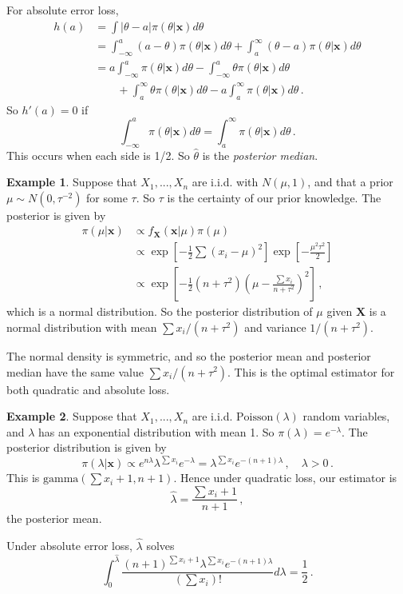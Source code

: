 \documentclass[a4paper,11pt]{article}
\theoremstyle{definition}
\newtheorem*{ex}{Example}
\numberwithin{equation}{section}
\begin{document}
For absolute error loss,
\begin{align*}
    h(a)&=\int|\theta-a|\pi(\theta|\mathbf{x})d\theta\\
    &=\int^a_{-\infty}(a-\theta)\pi(\theta|\mathbf{x})d\theta+\int^\infty_a(\theta-a)\pi(\theta|\mathbf{x})d\theta\\
    &= a\int^a_{-\infty}\pi(\theta|\mathbf{x})d\theta-\int^a_{-\infty}\theta\pi(\theta|\mathbf{x})d\theta\\
    &\qquad+\int_a^\infty\theta\pi(\theta|\mathbf{x})d\theta-a\int_a^\infty\pi(\theta|\mathbf{x})d\theta\,.
\end{align*}
So $h'(a)=0$ if
\[
\int^a_{-\infty}\pi(\theta|\mathbf{x})d\theta=\int_a^\infty\pi(\theta|\mathbf{x})d\theta\,.
\]
This occurs when each side is 1/2. So $\hat{\theta}$ is the \emph{posterior median}.

\begin{ex}
Suppose that $X_1,...,X_n$ are i.i.d. with $N(\mu,1)$, and that a prior $\mu\sim N(0,\tau^{-2})$ for some $\tau$. So $\tau$ is the certainty of our prior knowledge. The posterior is given by
\begin{align*}
    \pi(\mu|\mathbf{x})&\propto f_\mathbf{X}(\mathbf{x}|\mu)\pi(\mu)\\
    &\propto\exp\left[-\frac{1}{2}\sum(x_i-\mu)^2\right]\exp\left[-\frac{\mu^2\tau^2}{2}\right]\\
    &\propto\exp\left[-\frac{1}{2}(n+\tau^2)\left(\mu-\frac{\sum x_i}{n+\tau^2}\right)^2\right]\,,
\end{align*}
which is a normal distribution. So the posterior distribution of $\mu$ given $\mathbf{X}$ is a normal distribution with mean $\sum x_i/(n+\tau^2)$ and variance $1/(n+\tau^2)$.

The normal density is symmetric, and so the posterior mean and posterior median have the same value $\sum x_i/(n+\tau^2)$. This is the optimal estimator for both quadratic and absolute loss.
\end{ex}

\begin{ex}
Suppose that $X_1,...,X_n$ are i.i.d. $\text{Poisson}(\lambda)$ random variables, and $\lambda$ has an exponential distribution with mean 1. So $\pi(\lambda)=e^{-\lambda}$. The posterior distribution is given by
\[
\pi(\lambda|\mathbf{x})\propto e^{n\lambda}\lambda^{\sum x_i}e^{-\lambda}=\lambda^{\sum x_i}e^{-(n+1)\lambda}\,,\quad\lambda>0\,.
\]
This is $\text{gamma}(\sum x_i+1,n+1)$. Hence under quadratic loss, our estimator is 
\[
\hat{\lambda}=\frac{\sum x_i+1}{n+1}\,,
\]
the posterior mean.

Under absolute error loss, $\hat{\lambda}$ solves
\[
\int^{\hat{\lambda}}_0\frac{(n+1)^{\sum x_i+1}\lambda^{\sum x_i}e^{-(n+1)\lambda}}{(\sum x_i)!}d\lambda=\frac{1}{2}\,.
\]
\end{ex}
\end{document}
